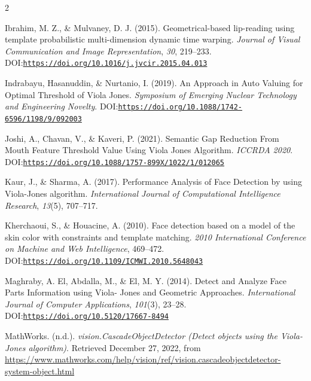 \documentclass[9pt]{extarticle}
\begin{document}
\begin{multicols}{2}
\begin{list}{}{
    \setlength{\leftmargin}{1.5em}
    \setlength{\itemindent}{-1.5em}
    \setlength{\parsep}{0pt}
    \setlength{\itemsep}{6pt}
}
\item \hypertarget{ref:5}{}Ibrahim, M. Z., \& Mulvaney, D. J. (2015). Geometrical-based lip-reading using template probabilistic multi-dimension dynamic time warping. \textit{Journal of Visual Communication and Image Representation}, \textit{30}, 219–233. DOI:\href{https://doi.org/10.1016/j.jvcir.2015.04.013}{{\nolinkurl{https://doi.org/10.1016/j.jvcir.2015.04.013}}}

\item \hypertarget{ref:6}{}Indrabayu, Hasanuddin, \& Nurtanio, I. (2019). An Approach in Auto Valuing for Optimal Threshold of Viola Jones. \textit{Symposium of Emerging Nuclear Technology and Engineering Novelty}. DOI:\href{https://doi.org/10.1088/1742-6596/1198/9/092003}{{\nolinkurl{https://doi.org/10.1088/1742-6596/1198/9/092003}}}

\item \hypertarget{ref:7}{}Joshi, A., Chavan, V., \& Kaveri, P. (2021). Semantic Gap Reduction From Mouth Feature Threshold Value Using Viola Jones Algorithm. \textit{ICCRDA 2020}. DOI:\href{https://doi.org/10.1088/1757-899X/1022/1/012065}{{\nolinkurl{https://doi.org/10.1088/1757-899X/1022/1/012065}}}

\item \hypertarget{ref:8}{}Kaur, J., \& Sharma, A. (2017). Performance Analysis of Face Detection by using Viola-Jones algorithm. \textit{International Journal of Computational Intelligence Research}, \textit{13}(5), 707–717.

\item \hypertarget{ref:9}{}Kherchaoui, S., \& Houacine, A. (2010). Face detection based on a model of the skin color with constraints and template matching. \textit{2010 International Conference on Machine and Web Intelligence}, 469–472. DOI:\href{https://doi.org/10.1109/ICMWI.2010.5648043}{{\nolinkurl{https://doi.org/10.1109/ICMWI.2010.5648043}}}

\item \hypertarget{ref:10}{}Maghraby, A. El, Abdalla, M., \& El, M. Y. (2014). Detect and Analyze Face Parts Information using Viola- Jones and Geometric Approaches. \textit{International Journal of Computer Applications}, \textit{101}(3), 23–28. DOI:\href{https://doi.org/10.5120/17667-8494}{{\nolinkurl{https://doi.org/10.5120/17667-8494}}}

\item \hypertarget{ref:11}{}MathWorks. (n.d.). \textit{vision.CascadeObjectDetector (Detect objects using the Viola-Jones algorithm)}. Retrieved December 27, 2022, from \url{https://www.mathworks.com/help/vision/ref/vision.cascadeobjectdetector-system-object.html}


\end{list}
\end{multicols}
\end{document}

